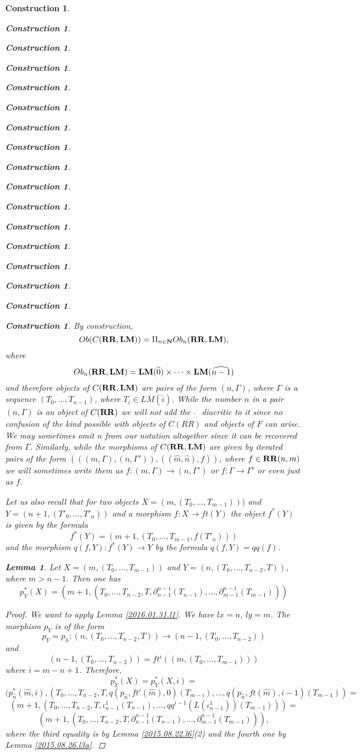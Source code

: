 \documentclass[12pt]{amsart}
\newenvironment{eq}{\begin{equation}}{\end{equation}}
\newtheorem{lemma}[proposition]{Lemma}
\newtheorem{construction}[proposition]{Construction}
\newcommand{\llabel}[1]{\label{#1}}
\newcommand{\sr}{\rightarrow}
\newcommand{\nn}{{\bf N\rm}}
\newcommand{\nat}{\nn}
\newcommand{\wh}{\widehat}
\newcommand{\RR}{{\bf RR}}
\newcommand{\LM}{{\bf LM}}
\begin{document}
\begin{construction}
\begin{construction}
\begin{construction}
\begin{construction}
\begin{construction}
\begin{construction}
\begin{construction}
\begin{construction}
\begin{construction}
\begin{construction}
\begin{construction}
\begin{construction}
\begin{construction}
\begin{construction}
\begin{construction}
\begin{construction}
\begin{construction}
By construction,
%
\begin{eq}\llabel{2016.01.21.eq3}
Ob(C(\RR,\LM))=\amalg_{n\in\nat}Ob_n(\RR,\LM),
\end{eq}%
%
where 
%
$$Ob_n(\RR,\LM)=\LM(\wh{0})\times\dots\times\LM(\wh{n-1})$$
%
and therefore objects of $C(\RR,\LM)$ are pairs of the form $(n,\Gamma)$, where
$\Gamma$ is a sequence $(T_0,\dots,T_{n-1})$, where $T_i\in LM(\wh{i})$. While
the number $n$ in a pair $(n,\Gamma)$ is an object of $C(\RR)$ we will not add
the ${\,\,\wh{}\,\,}$ diacritic to it since no confusion of the kind possible
with objects of $C(RR)$ and objects of $F$ can arise. We may sometimes omit $n$
from our notation altogether since it can be recovered from
$\Gamma$. Similarly, while the morphisms of $C(\RR,\LM)$ are given by iterated
pairs of the form $(((m,\Gamma),(n,\Gamma')),((\wh{m},\wh{n}),f))$, where $f\in
\RR(n,m)$ we will sometimes write them as $f:(m,\Gamma)\sr (n,\Gamma')$ or
$f:\Gamma\sr \Gamma'$ or even just as $f$.

Let us also recall that for two objects $X=(m,(T_0,\dots,T_{m-1})))$ and
$Y=(n+1,(T'_0,\dots,T'_{n}))$ and a morphism $f:X\sr ft(Y)$ the object $f^*(Y)$
is given by the formula
%
\begin{eq}\llabel{2015.09.09.eq3old}
f^*(Y)=(m+1,(T_0,\dots,T_{m-1},f(T'_{n})))
\end{eq}%
%
and the morphism $q(f,Y):f^*(Y)\sr Y$ by the formula $q(f,Y)=qq(f)$. 
% 
\begin{lemma}
\llabel{2015.08.26.l8}
Let $X=(m,(T_0,\dots,T_{m-1}))$ and $Y=(n,(T_0,\dots,T_{n-2},T))$, where $m>n-1$. Then one has
%
$$p_{Y}^*(X)=(m+1,(T_0,\dots,T_{n-2},T,\partial_{n-1}^{n-1}(T_{n-1}),\dots,\partial_{m-1}^{n-1}(T_{m-1})))$$
%
\end{lemma}
%
\begin{proof}
We want to apply Lemma \ref{2016.01.31.l1}. We have $lx=n$, $ly=m$. The morphism $p_Y$ is of the form
%
$$p_Y=p_{\wh{n}}:(n,(T_0,\dots,T_{n-2},T))\sr (n-1,(T_0,\dots,T_{n-2}))$$
%
and 
%
$$(n-1,(T_0,\dots,T_{n-2}))=ft^i((m,(T_0,\dots,T_{m-1})))$$
%
where $i=m-n+1$. Therefore, 
%
$$p_Y^*(X)=p_Y^*(X,i)=$$$$(p_{\wh{n}}^*(\wh{m},i), (T_0,\dots,T_{n-2},T,q(p_{\wh{n}},ft^i(\wh{m}),0)(T_{m-i}),\dots,q(p_{\wh{n}},ft(\wh{m}),i-1)(T_{m-1}))=$$
$$(m+1,(T_0,\dots,T_{n-2},T,\iota_{n-1}^1(T_{n-1}),\dots,qq^{i-1}(L(\iota_{n-1}^1))(T_{m-1})))=$$
$$(m+1,(T_0,\dots,T_{n-2},T,\partial_{n-1}^{n-1}(T_{n-1}),\dots,\partial_{m-1}^{n-1}(T_{m-1}))),$$
%
where the third equality is by Lemma \ref{2015.08.22.l6}(2) and the fourth one by Lemma \ref{2015.08.26.l3a}. 
\end{proof}
%


\end{construction}
\end{construction}
\end{construction}
\end{construction}
\end{construction}
\end{construction}
\end{construction}
\end{construction}
\end{construction}
\end{construction}
\end{construction}
\end{construction}
\end{construction}
\end{construction}
\end{construction}
\end{construction}
\end{construction}
\end{document}
